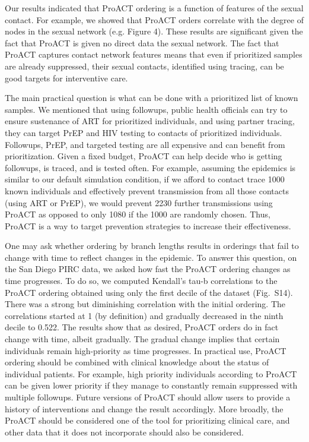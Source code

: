\documentclass[a4paper,11pt]{article}
\newcommand{\PLWH}{sample\xspace}
\begin{document}
Our results indicated that ProACT ordering is a function of features of the sexual contact. 
For example, we showed that ProACT orders correlate with the degree of nodes in the sexual network (e.g. Figure 4).
These results are significant given the fact that ProACT is given no direct data the sexual network. 
The fact that ProACT captures contact network features means that even if prioritized \PLWH{s} are already suppressed, their sexual contacts, identified using tracing, can be good targets for interventive care. 

The main practical question  is what can be done with a prioritized list of known \PLWH{s}.
We mentioned that using followups, public health officials can try to ensure sustenance of ART for prioritized individuals, and using partner tracing, they can target PrEP and HIV testing to contacts of  prioritized individuals. Followups, PrEP, and targeted testing are all expensive and can benefit from prioritization. 
Given a fixed budget, ProACT can help decide who is getting followups, is traced, and is tested often. 
For example, assuming the epidemics is similar to our default simulation condition, if we afford to contact trace 1000 known individuals and effectively prevent transmission from all those contacts (using ART or PrEP), we would prevent 2230 further transmissions using ProACT as opposed to only 1080 if the 1000 are randomly chosen. 
Thus, ProACT is a way to target prevention strategies to increase their effectiveness. 




One may ask whether ordering by branch lengths results in orderings that fail to change with time to reflect changes in the epidemic.
To answer this question,
on the San Diego PIRC data, we asked how fast the  ProACT ordering changes as time progresses. To do so, we computed Kendall's tau-b correlations to the ProACT ordering obtained using only the first decile of the dataset (Fig.~S14). There was a strong but diminishing correlation with the initial ordering. The correlations started at 1 (by definition) and gradually decreased in the ninth decile to 0.522. 
The results show that as desired,  ProACT orders do in fact change with time, albeit gradually.
The gradual change implies that certain individuals remain high-priority as time progresses. 
In practical use, ProACT ordering should be combined with clinical knowledge about the status of individual patients. For example, high priority individuals according to ProACT can be given lower priority if they manage to constantly remain suppressed with multiple followups.
Future versions of ProACT should allow users to provide a history of interventions and change the result accordingly. 
More broadly, the ProACT should be considered one of the tool for prioritizing clinical care, and other data that it does not incorporate should also be considered. 
\end{document}
